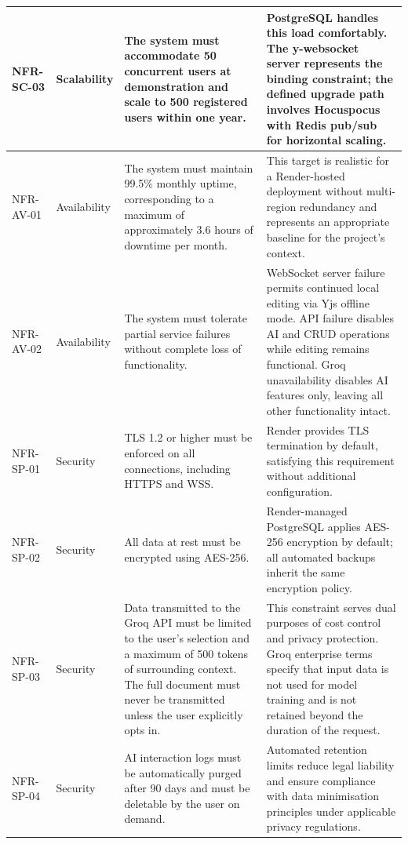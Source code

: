 \documentclass{article}
\begin{document}
{\begin{tabularx}{\textwidth}{|>{\hsize=0.3\hsize\raggedright\arraybackslash}X|>{\hsize=0.3\hsize\raggedright\arraybackslash}X|>{\hsize=1\hsize\raggedright\arraybackslash}X|>{\hsize=1.4\hsize\raggedright\arraybackslash}X|}
    \hline
    NFR-SC-03 & Scalability &
    The system must accommodate 50 concurrent users at demonstration and scale to 500 registered users within one year. &
    PostgreSQL handles this load comfortably. The y-websocket server represents the binding constraint; the defined upgrade path involves Hocuspocus with Redis pub/sub for horizontal scaling. \\
    \hline
    NFR-AV-01 & Availability &
    The system must maintain 99.5\% monthly uptime, corresponding to a maximum of approximately 3.6 hours of downtime per month. &
    This target is realistic for a Render-hosted deployment without multi-region redundancy and represents an appropriate baseline for the project's context. \\
    \hline
    NFR-AV-02 & Availability &
    The system must tolerate partial service failures without complete loss of functionality. &
    WebSocket server failure permits continued local editing via Yjs offline mode. API failure disables AI and CRUD operations while editing remains functional. Groq unavailability disables AI features only, leaving all other functionality intact. \\
    \hline
    NFR-SP-01 & Security &
    TLS 1.2 or higher must be enforced on all connections, including HTTPS and WSS. &
    Render provides TLS termination by default, satisfying this requirement without additional configuration. \\
    \hline
    NFR-SP-02 & Security &
    All data at rest must be encrypted using AES-256. &
    Render-managed PostgreSQL applies AES-256 encryption by default; all automated backups inherit the same encryption policy. \\
    \hline
    NFR-SP-03 & Security &
    Data transmitted to the Groq API must be limited to the user's selection and a maximum of 500 tokens of surrounding context. The full document must never be transmitted unless the user explicitly opts in. &
    This constraint serves dual purposes of cost control and privacy protection. Groq enterprise terms specify that input data is not used for model training and is not retained beyond the duration of the request. \\
    \hline
    NFR-SP-04 & Security &
    AI interaction logs must be automatically purged after 90 days and must be deletable by the user on demand. &
    Automated retention limits reduce legal liability and ensure compliance with data minimisation principles under applicable privacy regulations. \\
    \hline
\end{tabularx}
}
\end{document}
